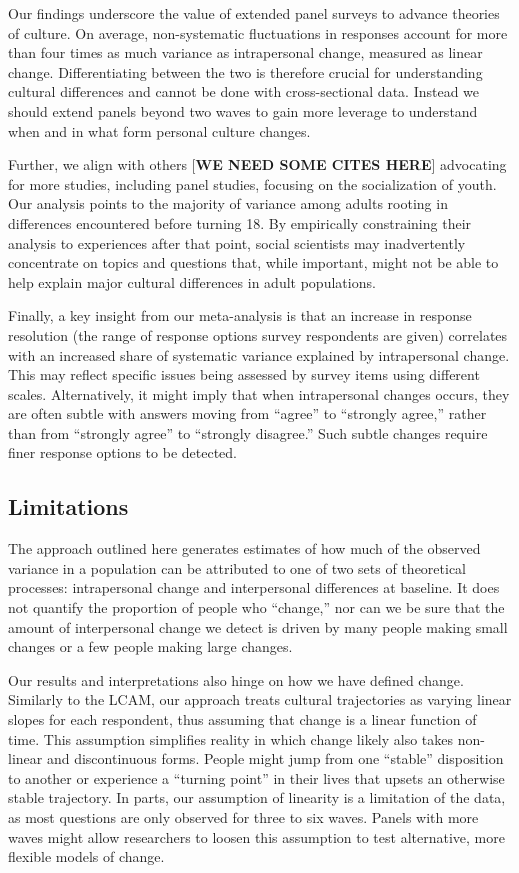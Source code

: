 \documentclass[
  12pt,
]{article}
\begin{document}
Our findings underscore the value of extended panel surveys to advance
theories of culture. On average, non-systematic fluctuations in
responses account for more than four times as much variance as
intrapersonal change, measured as linear change. Differentiating between
the two is therefore crucial for understanding cultural differences and
cannot be done with cross-sectional data. Instead we should extend
panels beyond two waves to gain more leverage to understand when and in
what form personal culture changes.

Further, we align with others {[}\textbf{WE NEED SOME CITES HERE}{]}
advocating for more studies, including panel studies, focusing on the
socialization of youth. Our analysis points to the majority of variance
among adults rooting in differences encountered before turning 18. By
empirically constraining their analysis to experiences after that point,
social scientists may inadvertently concentrate on topics and questions
that, while important, might not be able to help explain major cultural
differences in adult populations.

Finally, a key insight from our meta-analysis is that an increase in
response resolution (the range of response options survey respondents
are given) correlates with an increased share of systematic variance
explained by intrapersonal change. This may reflect specific issues
being assessed by survey items using different scales. Alternatively, it
might imply that when intrapersonal changes occurs, they are often
subtle with answers moving from ``agree'' to ``strongly agree,'' rather
than from ``strongly agree'' to ``strongly disagree.'' Such subtle
changes require finer response options to be detected.

\hypertarget{limitations}{%
\subsection{Limitations}\label{limitations}}

The approach outlined here generates estimates of how much of the
observed variance in a population can be attributed to one of two sets
of theoretical processes: intrapersonal change and interpersonal
differences at baseline. It does not quantify the proportion of people
who ``change,'' nor can we be sure that the amount of interpersonal
change we detect is driven by many people making small changes or a few
people making large changes.

Our results and interpretations also hinge on how we have defined
change. Similarly to the LCAM, our approach treats cultural trajectories
as varying linear slopes for each respondent, thus assuming that change
is a linear function of time. This assumption simplifies reality in
which change likely also takes non-linear and discontinuous forms.
People might jump from one ``stable'' disposition to another or
experience a ``turning point'' in their lives that upsets an otherwise
stable trajectory. In parts, our assumption of linearity is a limitation
of the data, as most questions are only observed for three to six waves.
Panels with more waves might allow researchers to loosen this assumption
to test alternative, more flexible models of change.
\end{document}
